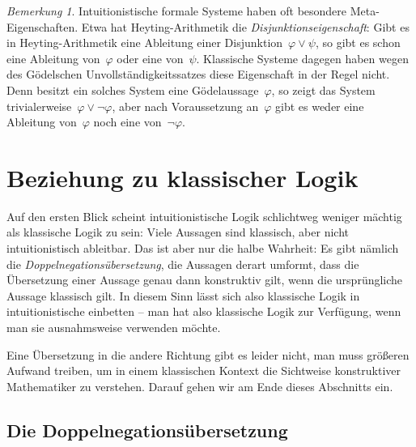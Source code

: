 \documentclass[a4paper,ngerman,12pt]{scrartcl}
\theoremstyle{definition}
\theoremstyle{plain}
\theoremstyle{remark}
\newtheorem{bem}[defn]{Bemerkung}
\renewcommand{\_}{\mathpunct{.}\,}
\newcommand{\?}{\,{:}\,}
\begin{document}
\begin{bem}Intuitionistische formale Systeme haben oft besondere
Meta-Eigen\-schaf\-ten. Etwa hat Heyting-Arithmetik die
\emph{Disjunktionseigenschaft}: Gibt es in Heyting-Arithmetik eine
Ableitung einer Disjunktion~$\varphi \vee \psi$, so gibt es schon eine Ableitung von~$\varphi$
oder eine von~$\psi$. Klassische Systeme dagegen haben wegen des Gödelschen
Unvollständigkeitssatzes diese Eigenschaft in
der Regel nicht. Denn besitzt ein solches System eine
Gödelaussage~$\varphi$, so zeigt das System trivialerweise~$\varphi
\vee \neg\varphi$, aber nach Voraussetzung an~$\varphi$ gibt es weder eine
Ableitung von~$\varphi$ noch eine von~$\neg\varphi$.
\end{bem}


\section{Beziehung zu klassischer Logik}
\label{bez-klassische-logik}

Auf den ersten Blick scheint intuitionistische Logik schlichtweg weniger
mächtig als klassische Logik zu sein: Viele Aussagen sind klassisch, aber nicht
intuitionistisch ableitbar. Das ist aber nur die halbe
Wahrheit: Es gibt nämlich die \emph{Doppel\-ne\-ga\-tions\-über\-set\-zung},
die Aussagen derart umformt, dass die
Übersetzung einer Aussage genau dann konstruktiv gilt, wenn die ursprüngliche Aussage
klassisch gilt. In diesem Sinn lässt sich also klassische Logik in
intuitionistische einbetten -- man hat also klassische Logik zur Verfügung,
wenn man sie ausnahmsweise verwenden möchte.

Eine Übersetzung in die andere Richtung gibt es leider nicht, man muss größeren
Aufwand treiben, um in einem klassischen Kontext die Sichtweise konstruktiver
Mathematiker zu verstehen. Darauf gehen wir am Ende dieses Abschnitts ein.


\subsection{Die Doppelnegationsübersetzung}
\end{document}
